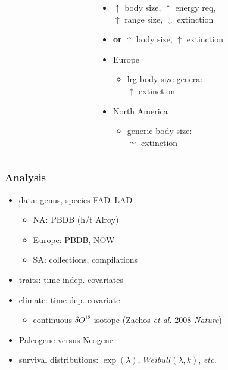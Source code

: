 \documentclass{beamer}
\begin{document}
\begin{frame}
\begin{columns}
\begin{column}{0.5\textwidth}
      \tiny{}
    \end{column}
    \begin{column}{0.5\textwidth}
      \begin{itemize}
        \item \(\uparrow\) body size, \(\uparrow\) energy req, \\\(\uparrow\) range size, \(\downarrow\) extinction
        \item \textbf{or} \(\uparrow\) body size, \(\uparrow\) extinction 
        \item Europe
          \begin{itemize}
            \item lrg body size genera: \\\(\uparrow\) extinction
          \end{itemize}
        \item North America
          \begin{itemize}
            \item generic body size: \\\(\simeq\) extinction
          \end{itemize}
      \end{itemize}
    \end{column}
  \end{columns}
\end{frame}

\begin{frame}
  \frametitle{Analysis}

  \begin{itemize}
    \item data: genus, species FAD--LAD
      \begin{itemize}
        \item NA: PBDB (h/t Alroy)
        \item Europe: PBDB, NOW
        \item SA: collections, compilations
      \end{itemize}
    \item traits: time-indep. covariates
    \item climate: time-dep. covariate
      \begin{itemize}
        \item continuous \(\delta O^{18}\) isotope (Zachos \textit{et al.} 2008 \textit{Nature})
      \end{itemize}
    \item Paleogene versus Neogene
    \item survival distributions: \(\exp(\lambda)\), \(Weibull(\lambda, k)\), \textit{etc.}
  \end{itemize}
\end{frame}
\end{document}
